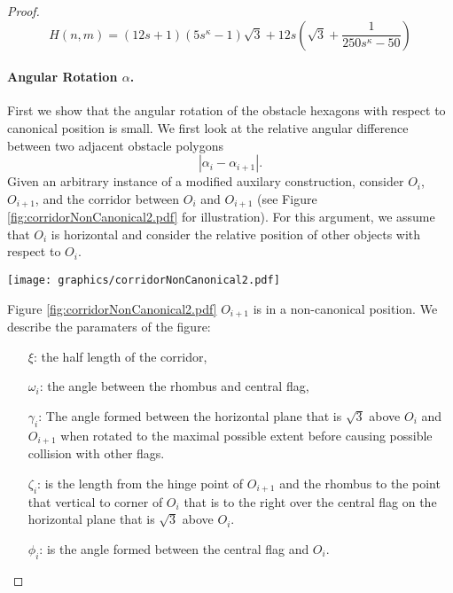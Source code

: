 \documentclass[10pt]{CSUNthesis}
\theoremstyle{plain}%
\theoremstyle{definition}
\theoremstyle{remark}
\newcommand{\lr}[1]{\left( #1 \right)}
\begin{document}
\begin{proof}
\begin{equation}\label{eqn:Hnm}
	H(n,m) = (12s+1)  \lr{5s^\kappa -1}  \sqrt{3} + 12s \lr{\sqrt{3}+ \frac{1}{250s^\kappa -50}}				
\end{equation}\paragraph{Angular Rotation $\alpha$.}
First we show that the angular rotation of the obstacle hexagons with respect to canonical position is small.  
We first look at the relative angular difference between two adjacent obstacle polygons
$$\left\vert \alpha_i - \alpha_{i+1} \right\vert.$$
Given an arbitrary instance of a modified auxilary construction, consider $O_i$, $O_{i+1}$, and the corridor between $O_i$ and $O_{i+1}$ (see Figure \ref{fig:corridorNonCanonical2.pdf} for illustration).  
For this argument, we assume that $O_i$ is horizontal and consider the relative position of other objects with respect to $O_{i}$.

\begin{minipage}{\linewidth}
\begin{center}
\texttt{[image: graphics/corridorNonCanonical2.pdf]}
\label{fig:corridorNonCanonical2.pdf}
\end{center}
\end{minipage}

Figure \ref{fig:corridorNonCanonical2.pdf} $O_{i+1}$ is in a non-canonical position.  We describe the paramaters of the figure:
\begin{itemize}[leftmargin=.75in, rightmargin=.75in]
	\item[$\xi$:] the half length of the corridor,
	\item[$\omega_i$:] the angle between the rhombus and central flag, 
	\item[$\gamma_i$:] The angle formed between the horizontal plane that is $\sqrt{3}$ above $O_i$ and $O_{i+1}$ when rotated to the maximal possible extent before causing possible collision with other flags. 
	\item[$\zeta_i$:]  is the length from the hinge point of $O_{i+1}$ and the rhombus to the point that vertical to corner of $O_i$ that is to the right over the central flag on the horizontal plane that is $\sqrt{3}$ above $O_i$.
	\item[$\phi_i$:] is the angle formed between the central flag and $O_i$.
\end{itemize}


\end{proof}
\end{document}
